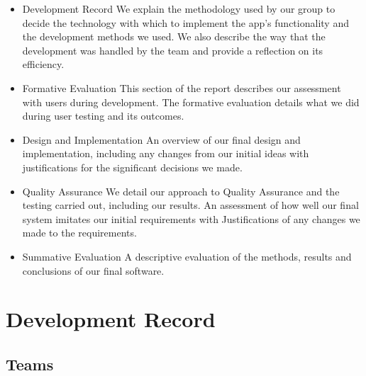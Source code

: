 \documentclass[12pt,a4paper]{article}
\begin{document}
      \begin{itemize}
        \item {Development Record}
          We explain the methodology used by our group to decide the technology with which to implement the app’s functionality and the development methods we used. We also describe the way that the development was handled by the team and provide a reflection on its efficiency.

        \item {Formative Evaluation}
          This section of the report describes our assessment with users during development. The formative evaluation details what we did during user testing and its outcomes.

        \item { Design and Implementation }
          An overview of our final design and implementation, including any changes from our initial ideas with justifications for the significant decisions we made.

        \item { Quality Assurance}
          We detail our approach to Quality Assurance and the testing carried out, including our results. An assessment of how well our final system imitates our initial requirements with Justifications of any changes we made to the requirements.

        \item { Summative Evaluation}
          A descriptive evaluation of the methods, results and conclusions of our final software.
      \end{itemize}

    \section{Development Record}
      \subsection{Teams} 
\end{document}
